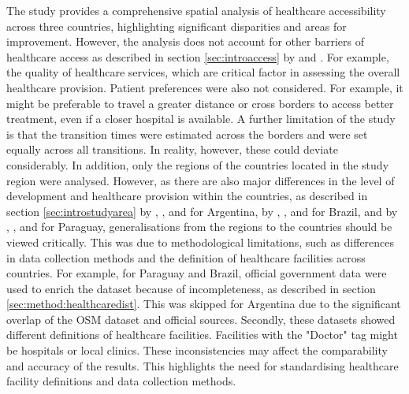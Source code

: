 \documentclass[11pt, a4paper]{report}
\begin{document}
%
The study provides a comprehensive spatial analysis of healthcare accessibility across three countries, highlighting significant disparities and areas for improvement. However, the analysis does not account for other barriers of healthcare access as described in section \ref{sec:introaccess} by \citet{wang_assessing_2005} and \citet{carrillo_defining_2011}. For example, the quality of healthcare services, which are critical factor in assessing the overall healthcare provision. Patient preferences were also not considered. For example, it might be preferable to travel a greater distance or cross borders to access better treatment, even if a closer hospital is available.
A further limitation of the study is that the transition times were estimated across the borders and were set equally across all transitions. In reality, however, these could deviate considerably. 
In addition, only the regions of the countries located in the study region were analysed. However, as there are also major differences in the level of development and healthcare provision within the countries, as described in section \ref{sec:introstudyarea} by \citet{gilardino_access_2016}, \citet{palacios_need_2020}, and \citet{vacarezza_exploring_2023} for Argentina, by \citet{palmeira_analysis_2022}, \citet{santos_health_2022}, and \citet{silva_emergency_2021} for Brazil, and by \citet{amnesty_international_usa_paraguay_2024}, \citet{capurro_socioeconomic_2022}, and \citet{world_health_organization_access_2024} for Paraguay, generalisations from the regions to the countries should be viewed critically. This was due to methodological limitations, such as differences in data collection methods and the definition of healthcare facilities across countries. For example, for Paraguay and Brazil, official government data were used to enrich the dataset because of incompleteness, as described in section \ref{sec:method:healthcaredist}. This was skipped for Argentina due to the significant overlap of the OSM dataset and official sources. Secondly, these datasets showed different definitions of healthcare facilities. Facilities with the "Doctor" tag might be hospitals or local clinics. These inconsistencies may affect the comparability and accuracy of the results. This highlights the need for standardising healthcare facility definitions and data collection methods.
 \\
%
\end{document}
